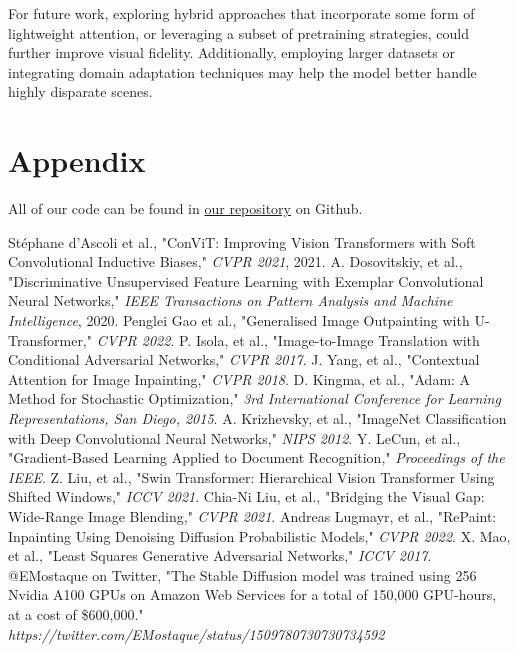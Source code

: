 \documentclass[sigconf]{acmart}
\begin{document}
For future work, exploring hybrid approaches that incorporate some form of lightweight attention, or leveraging a subset of pretraining strategies, could further improve visual fidelity. Additionally, employing larger datasets or integrating domain adaptation techniques may help the model better handle highly disparate scenes.

\section*{Appendix}

All of our code can be found in \textcolor{red}{\href{https://github.com/yewentao256/CS5787-Final}{our repository}} on Github.

\begin{thebibliography}{9}
     Stéphane d’Ascoli et al., "ConViT: Improving Vision Transformers with Soft Convolutional Inductive Biases," \textit{CVPR 2021}, 2021.
     A. Dosovitskiy, et al., "Discriminative Unsupervised Feature Learning with Exemplar Convolutional Neural Networks," \textit{IEEE Transactions on Pattern Analysis and Machine Intelligence}, 2020.
     Penglei Gao et al., "Generalised Image Outpainting with U-Transformer," \textit{CVPR 2022}.
     P. Isola, et al., "Image-to-Image Translation with Conditional Adversarial Networks," \textit{CVPR 2017}.
     J. Yang, et al., "Contextual Attention for Image Inpainting," \textit{CVPR 2018}.
     D. Kingma, et al., "Adam: A Method for Stochastic Optimization," \textit{3rd International Conference for Learning Representations, San Diego, 2015}.
     A. Krizhevsky, et al., "ImageNet Classification with Deep Convolutional Neural Networks," \textit{NIPS 2012}.
     Y. LeCun, et al., "Gradient-Based Learning Applied to Document Recognition," \textit{Proceedings of the IEEE}.
     Z. Liu, et al., "Swin Transformer: Hierarchical Vision Transformer Using Shifted Windows," \textit{ICCV 2021}.
     Chia-Ni Liu, et al., "Bridging the Visual Gap: Wide-Range Image Blending," \textit{CVPR 2021}.
     Andreas Lugmayr, et al., "RePaint: Inpainting Using Denoising Diffusion Probabilistic Models," \textit{CVPR 2022}.
     X. Mao, et al., "Least Squares Generative Adversarial Networks," \textit{ICCV 2017}.
     @EMostaque on Twitter, "The Stable Diffusion model was trained using 256 Nvidia A100 GPUs on Amazon Web Services for a total of 150,000 GPU-hours, at a cost of \$600,000." \textit{https://twitter.com/EMostaque/status/1509780730730734592}

\end{thebibliography}
\end{document}
